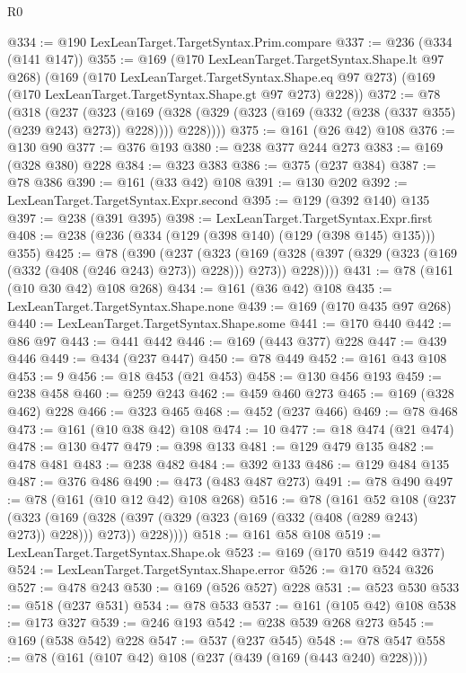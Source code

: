 \begin{lexlean}{R0}
\begin{coremodule}
@334 := @190 LexLeanTarget.TargetSyntax.Prim.compare
@337 := @236 (@334 (@141 @147))
@355 := @169
    (@170 LexLeanTarget.TargetSyntax.Shape.lt @97 @268)
    (@169
      (@170 LexLeanTarget.TargetSyntax.Shape.eq @97 @273)
      (@169 (@170 LexLeanTarget.TargetSyntax.Shape.gt @97 @273) @228))
@372 := @78
    (@318
      (@237
        (@323
          (@169 (@328 (@329 (@323 (@169 (@332 (@238 (@337 @355) (@239 @243) @273)) @228)))) @228))))
@375 := @161 (@26 @42) @108
@376 := @130 @90
@377 := @376 @193
@380 := @238 @377 @244 @273
@383 := @169 (@328 @380) @228
@384 := @323 @383
@386 := @375 (@237 @384)
@387 := @78 @386
@390 := @161 (@33 @42) @108
@391 := @130 @202
@392 := LexLeanTarget.TargetSyntax.Expr.second
@395 := @129 (@392 @140) @135
@397 := @238 (@391 @395)
@398 := LexLeanTarget.TargetSyntax.Expr.first
@408 := @238 (@236 (@334 (@129 (@398 @140) (@129 (@398 @145) @135))) @355)
@425 := @78
    (@390
      (@237
        (@323
          (@169 (@328 (@397 (@329 (@323 (@169 (@332 (@408 (@246 @243) @273)) @228))) @273)) @228))))
@431 := @78 (@161 (@10 @30 @42) @108 @268)
@434 := @161 (@36 @42) @108
@435 := LexLeanTarget.TargetSyntax.Shape.none
@439 := @169 (@170 @435 @97 @268)
@440 := LexLeanTarget.TargetSyntax.Shape.some
@441 := @170 @440
@442 := @86 @97
@443 := @441 @442
@446 := @169 (@443 @377) @228
@447 := @439 @446
@449 := @434 (@237 @447)
@450 := @78 @449
@452 := @161 @43 @108
@453 := 9
@456 := @18 @453 (@21 @453)
@458 := @130 @456 @193
@459 := @238 @458
@460 := @259 @243
@462 := @459 @460 @273
@465 := @169 (@328 @462) @228
@466 := @323 @465
@468 := @452 (@237 @466)
@469 := @78 @468
@473 := @161 (@10 @38 @42) @108
@474 := 10
@477 := @18 @474 (@21 @474)
@478 := @130 @477
@479 := @398 @133
@481 := @129 @479 @135
@482 := @478 @481
@483 := @238 @482
@484 := @392 @133
@486 := @129 @484 @135
@487 := @376 @486
@490 := @473 (@483 @487 @273)
@491 := @78 @490
@497 := @78 (@161 (@10 @12 @42) @108 @268)
@516 := @78
    (@161
      @52
      @108
      (@237
        (@323
          (@169 (@328 (@397 (@329 (@323 (@169 (@332 (@408 (@289 @243) @273)) @228))) @273)) @228))))
@518 := @161 @58 @108
@519 := LexLeanTarget.TargetSyntax.Shape.ok
@523 := @169 (@170 @519 @442 @377)
@524 := LexLeanTarget.TargetSyntax.Shape.error
@526 := @170 @524 @326
@527 := @478 @243
@530 := @169 (@526 @527) @228
@531 := @523 @530
@533 := @518 (@237 @531)
@534 := @78 @533
@537 := @161 (@105 @42) @108
@538 := @173 @327
@539 := @246 @193
@542 := @238 @539 @268 @273
@545 := @169 (@538 @542) @228
@547 := @537 (@237 @545)
@548 := @78 @547
@558 := @78 (@161 (@107 @42) @108 (@237 (@439 (@169 (@443 @240) @228))))

\end{coremodule}
\end{lexlean}
